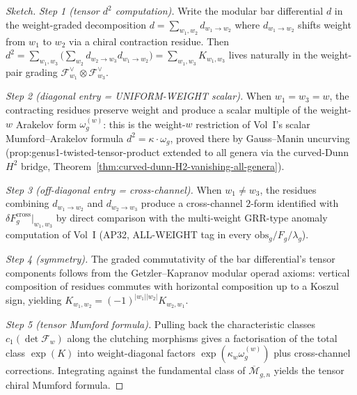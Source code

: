 \documentclass[11pt]{article}
\begin{document}
\begin{proof}[Sketch]
\textit{Step 1 (tensor $d^2$ computation).} Write the modular bar
differential $d$ in the weight-graded decomposition
$d = \sum_{w_1, w_2} d_{w_1 \to w_2}$ where $d_{w_1 \to w_2}$
shifts weight from $w_1$ to $w_2$ via a chiral contraction
residue. Then
$d^2 = \sum_{w_1, w_3} \bigl(
       \sum_{w_2} d_{w_2 \to w_3} d_{w_1 \to w_2}\bigr)
     = \sum_{w_1, w_3} K_{w_1, w_3}$
lives naturally in the weight-pair grading
$\mathcal{F}_{w_1}^\vee \otimes \mathcal{F}_{w_3}^\vee$.

\textit{Step 2 (diagonal entry = UNIFORM-WEIGHT scalar).} When
$w_1 = w_3 = w$, the contracting residues preserve weight and
produce a scalar multiple of the weight-$w$ Arakelov form
$\omega_g^{(w)}$: this is the weight-$w$ restriction of Vol~I's
scalar Mumford--Arakelov formula $d^2 = \kappa \cdot \omega_g$,
proved there by Gauss--Manin uncurving
(prop:genus1-twisted-tensor-product extended to all genera via
the curved-Dunn $H^2$ bridge,
Theorem~\ref{thm:curved-dunn-H2-vanishing-all-genera}).

\textit{Step 3 (off-diagonal entry = cross-channel).} When
$w_1 \ne w_3$, the residues combining $d_{w_1 \to w_2}$ and
$d_{w_2 \to w_3}$ produce a cross-channel $2$-form identified with
$\delta F_g^{\mathrm{cross}}|_{w_1, w_3}$ by direct comparison
with the multi-weight GRR-type anomaly computation of Vol~I
(AP32, ALL-WEIGHT tag in every $\mathrm{obs}_g/F_g/\lambda_g$).

\textit{Step 4 (symmetry).} The graded commutativity of the
bar differential's tensor components follows from the
Getzler--Kapranov modular operad axioms: vertical composition of
residues commutes with horizontal composition up to a Koszul
sign, yielding $K_{w_1, w_2} = (-1)^{|w_1||w_2|} K_{w_2, w_1}$.

\textit{Step 5 (tensor Mumford formula).} Pulling back the
characteristic classes $c_1(\det \mathcal{F}_w)$ along the
clutching morphisms gives a factorisation of the total class
$\exp(K)$ into weight-diagonal factors
$\exp(\kappa_w \omega_g^{(w)})$ plus cross-channel corrections.
Integrating against the fundamental class of
$\overline{\mathcal{M}}_{g,n}$ yields the tensor chiral Mumford
formula.
\end{proof}
\end{document}
